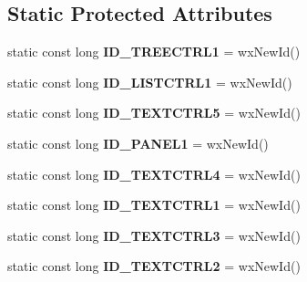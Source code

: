 \subsection*{Static Protected Attributes}
\begin{DoxyCompactItemize}
\item 
\hypertarget{class_new_dialog_a20c2ad7818b872789ca2fb21e6806e20}{static const long {\bfseries I\+D\+\_\+\+T\+R\+E\+E\+C\+T\+R\+L1} = wx\+New\+Id()}\label{class_new_dialog_a20c2ad7818b872789ca2fb21e6806e20}

\item 
\hypertarget{class_new_dialog_a0aef7d7ae3bb368a87b0ce504b77ec9c}{static const long {\bfseries I\+D\+\_\+\+L\+I\+S\+T\+C\+T\+R\+L1} = wx\+New\+Id()}\label{class_new_dialog_a0aef7d7ae3bb368a87b0ce504b77ec9c}

\item 
\hypertarget{class_new_dialog_ada2b1a5c697b6f900d2fa7b8e13594cc}{static const long {\bfseries I\+D\+\_\+\+T\+E\+X\+T\+C\+T\+R\+L5} = wx\+New\+Id()}\label{class_new_dialog_ada2b1a5c697b6f900d2fa7b8e13594cc}

\item 
\hypertarget{class_new_dialog_a5bea1bb9a7c5623bcdfcfc0490e1a4b9}{static const long {\bfseries I\+D\+\_\+\+P\+A\+N\+E\+L1} = wx\+New\+Id()}\label{class_new_dialog_a5bea1bb9a7c5623bcdfcfc0490e1a4b9}

\item 
\hypertarget{class_new_dialog_ad48cccd177e5359fcff6daa6c1750485}{static const long {\bfseries I\+D\+\_\+\+T\+E\+X\+T\+C\+T\+R\+L4} = wx\+New\+Id()}\label{class_new_dialog_ad48cccd177e5359fcff6daa6c1750485}

\item 
\hypertarget{class_new_dialog_a873b13e70226c0c50c58a2a31e7c5e6a}{static const long {\bfseries I\+D\+\_\+\+T\+E\+X\+T\+C\+T\+R\+L1} = wx\+New\+Id()}\label{class_new_dialog_a873b13e70226c0c50c58a2a31e7c5e6a}

\item 
\hypertarget{class_new_dialog_ad2715217af15a1602a5cbef0c247862e}{static const long {\bfseries I\+D\+\_\+\+T\+E\+X\+T\+C\+T\+R\+L3} = wx\+New\+Id()}\label{class_new_dialog_ad2715217af15a1602a5cbef0c247862e}

\item 
\hypertarget{class_new_dialog_af636619ae6f8c134f2eafce30a3a9c25}{static const long {\bfseries I\+D\+\_\+\+T\+E\+X\+T\+C\+T\+R\+L2} = wx\+New\+Id()}\label{class_new_dialog_af636619ae6f8c134f2eafce30a3a9c25}


\end{DoxyCompactItemize}
